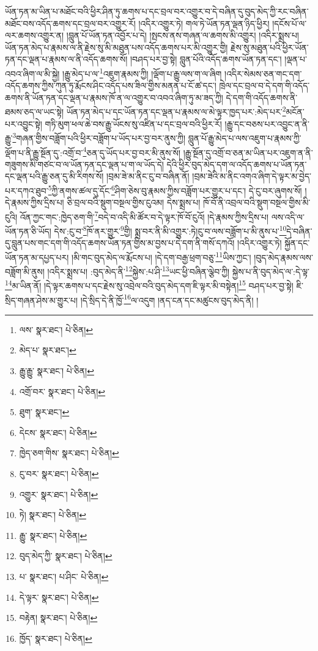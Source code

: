ཡོན་ཏན་མ་ཡིན་པ་མཐོང་བའི་ཕྱིར་ཤིན་ཏུ་ཆགས་པ་དང་བྲལ་བར་འགྱུར་བ་དེ་བཞིན་དུ་བུད་མེད་ཀྱི་རང་བཞིན་མཐོང་བས་འདོད་ཆགས་དང་བྲལ་བར་འགྱུར་རོ། །འདིར་འགྱུར་ཏེ། གལ་ཏེ་ཡོན་ཏན་ལྡན་ཉིད་ཕྱིར། །དངོས་པོ་ལ་ལར་ཆགས་འགྱུར་ན། །བླུན་པོ་ཡོན་ཏན་འབྱོར་པ་དེ། །སྤངས་ནས་གཞན་ལ་ཆགས་མི་འགྱུར། །འདིར་སྨྲས་པ། ཡོན་ཏན་མེད་པ་རྣམས་ལ་ནི་རྗེས་སུ་མི་མཐུན་པས་འདོད་ཆགས་པར་མི་འགྱུར་གྱི། རྗེས་སུ་མཐུན་པའི་ཕྱིར་ཡོན་ཏན་དང་ལྡན་པ་རྣམས་ལ་ནི་འདོད་ཆགས་སོ། །བཤད་པར་བྱ་སྟེ། བླུན་པོའི་འདོད་ཆགས་ཡོན་ཏན་དང་། །ལྡན་པ་འབའ་ཞིག་ལ་མི་སྐྱེ། །རྒྱུ་མེད་པ་ལ་\footnote{ལས་  སྣར་ཐང་།  པེ་ཅིན། }འཇུག་རྣམས་ཀྱི། །ལྡོག་པ་རྒྱུ་ལས་ག་ལ་ཞིག །འདིར་སེམས་ཅན་གང་དག་འདོད་ཆགས་ཀྱིས་ཀུན་ཏུ་རྨོངས་ཤིང་འདོད་པས་ཟིལ་གྱིས་མནན་པ་ངོ་ཚ་དང་། ཁྲེལ་དང་བྲལ་བ་དེ་དག་གི་འདོད་ཆགས་ནི་ཡོན་ཏན་དང་ལྡན་པ་རྣམས་ཁོ་ན་ལ་འགྱུར་བ་འབའ་ཞིག་ཏུ་མ་ཟད་ཀྱི། དེ་དག་གི་འདོད་ཆགས་ནི་ཐམས་ཅད་ལ་ཡང་སྟེ། ཡོན་ཏན་མེད་པ་དང་ཡོན་ཏན་དང་ལྡན་པ་རྣམས་ལ་མེ་ལྟར་ཁྱད་པར་:མེད་པར་\footnote{མེད་པ་  སྣར་ཐང་། }མངོན་པར་འབྱུང་སྟེ། གཏི་མུག་ཕལ་ཆེ་བས་རྒྱུ་ཡོངས་སུ་འཛིན་པ་དང་བྲལ་བའི་ཕྱིར་རོ། །རྒྱུ་དང་བཅས་པར་འབྱུང་ན་ནི་རྒྱུ་\footnote{རྒྱུ་རྒྱུ་  སྣར་ཐང་།  པེ་ཅིན། }གཞན་གྱིས་བཟློག་པའི་ཕྱིར་བཟློག་པ་ཡོད་པར་བྱ་བར་ནུས་ཀྱི། བླུན་པོ་རྒྱུ་མེད་པ་ལས་འཇུག་པ་རྣམས་ཀྱི་ལྡོག་པ་ནི་རྒྱུ་སྔོན་དུ་:འགྲོ་བ་\footnote{འགྲོ་བར་  སྣར་ཐང་།  པེ་ཅིན། }ཅན་དུ་ཡོད་པར་བྱ་བར་མི་ནུས་སོ། །རྒྱུ་སྔོན་དུ་འགྲོ་བ་ཅན་མ་ཡིན་པར་འཇུག་ན་ནི་གཟུགས་མི་གཙང་བ་ལ་ཡོན་ཏན་དང་ལྡན་པ་ག་ལ་ཡོད་དེ། དེའི་ཕྱིར་བུད་མེད་དག་ལ་འདོད་ཆགས་པ་ཡོན་ཏན་དང་ལྡན་པའི་རྒྱུ་ཅན་དུ་མི་རིགས་སོ། །བྲམ་ཟེ་མ་ནིང་ངུ་བ་བཞིན་ནོ། །བྲམ་ཟེའི་མ་ནིང་འགའ་ཞིག་དེ་ལྟར་མ་བྱེད་པར་དཀའ་ཐུབ་\footnote{ཐུག་  སྣར་ཐང་། }ཀྱི་ནགས་ཚལ་དུ་དོང་\footnote{དེངས་  སྣར་ཐང་།  པེ་ཅིན། }ཤིག་ཅེས་བུ་རྣམས་ཀྱིས་བཟློག་པར་གྱུར་པ་དང་། དེ་ངུ་བར་ཞུགས་སོ། །དེ་རྣམས་ཀྱིས་དྲིས་པ། ཅི་བྲལ་བའི་སྡུག་བསྔལ་གྱིས་ངུའམ། དེས་སྨྲས་པ། ཁོ་བོ་ནི་འབྲལ་བའི་སྡུག་བསྔལ་གྱིས་མི་ངུའི། འོན་ཀྱང་གང་:ཁྱེད་ཅག་གི་\footnote{ཁྱེད་ཅག་གིས་  སྣར་ཐང་།  པེ་ཅིན། }བདེ་བ་འདི་མི་ཚོར་བ་དེ་ལྟར་ཁོ་བོ་ངུའོ། །དེ་རྣམས་ཀྱིས་དྲིས་པ། ལས་འདི་ལ་ཡོན་ཏན་ཅི་ཡོད། དེས་:ངུ་བ་\footnote{ངུ་བར་  སྣར་ཐང་།  པེ་ཅིན། }ཁོ་ནར་གྱུར་\footnote{འགྱུར་  སྣར་ཐང་།  པེ་ཅིན། }གྱི། སྨྲ་བར་ནི་མི་འགྱུར་:ཏེ།ངུ་བ་ལས་བཟློག་པ་མི་ནུས་པ་\footnote{ཏེ།  སྣར་ཐང་།  པེ་ཅིན། }དེ་བཞིན་དུ་བླུན་པས་གང་དག་གི་འདོད་ཆགས་ཡོན་ཏན་གྱིས་མ་བྱས་པ་དེ་དག་ནི་གསོ་དཀའོ། །འདིར་འགྱུར་ཏེ། སྐྱོན་དང་ཡོན་ཏན་མ་དཔྱད་པར། །མི་གང་བུད་མེད་ལ་རྨོངས་པ། །དེ་དག་བརྒྱ་ཕྲག་བཅུ་\footnote{རྒྱུ་  སྣར་ཐང་།  པེ་ཅིན། }ཡིས་ཀྱང་། །བུད་མེད་རྣམས་ལས་བཟློག་མི་ནུས། །འདིར་སྨྲས་པ། :བུད་མེད་ནི་\footnote{བུད་མེད་ཀྱི་  སྣར་ཐང་།  པེ་ཅིན། }སྐྱེས་:པ་ཤི་\footnote{པ་  སྣར་ཐང་། པ་ཤིང་  པེ་ཅིན། }ཡང་ཕྱི་བཞིན་ལྕེབ་ཀྱི། སྐྱེས་པ་ནི་བུད་མེད་ལ་:དེ་ལྟ་\footnote{དེ་ལྟར་  སྣར་ཐང་།  པེ་ཅིན། }མ་ཡིན་ནོ། །དེ་ལྟར་ཆགས་པ་དང་རྗེས་སུ་འབྲེལ་བའི་བུད་མེད་དག་ཇི་ལྟར་མི་བསྟེན།\footnote{བརྟེན།  སྣར་ཐང་།  པེ་ཅིན། } བཤད་པར་བྱ་སྟེ། ཇི་སྲིད་གཞན་ཤེས་མ་གྱུར་པ། །དེ་སྲིད་དེ་ནི་ཁྱོ་\footnote{ཁྱོད་  སྣར་ཐང་།  པེ་ཅིན། }ལ་འདུག །ནད་ངན་དང་མཚུངས་བུད་མེད་ནི། །
